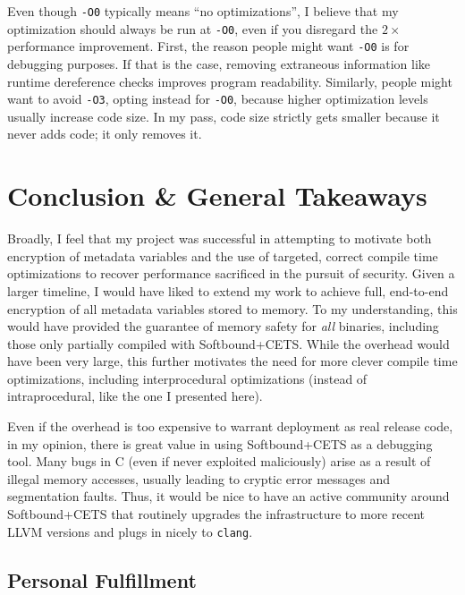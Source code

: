 \documentclass{article}
\begin{document}
                \bigbreak{}

                Even though \verb|-O0| typically means ``no optimizations'', I
                believe that my optimization should always be run at \verb|-O0|,
                even if you disregard the $2\times$ performance improvement.
                First, the reason people might want \verb|-O0| is for debugging
                purposes. If that is the case, removing extraneous information
                like runtime dereference checks improves program readability.
                Similarly, people might want to avoid \verb|-O3|, opting instead
                for \verb|-O0|, because higher optimization levels usually
                increase code size. In my pass, code size strictly gets smaller
                because it never adds code; it only removes it.
                

\section{Conclusion \& General Takeaways}

    Broadly, I feel that my project was successful in attempting to motivate
    both encryption of metadata variables and the use of targeted,
    correct compile time optimizations to recover performance sacrificed in the 
    pursuit of security. Given a larger timeline, I would have liked to extend
    my work to achieve full, end-to-end encryption of all metadata variables
    stored to memory. To my understanding, this would have provided the guarantee
    of memory safety for \textit{all} binaries, including those only partially
    compiled with Softbound+CETS. While the overhead would have been very large,
    this further motivates the need for more clever compile time optimizations, including
    interprocedural optimizations (instead of intraprocedural, like the one I
    presented here).
    
    \bigbreak{}
    Even if the overhead is too expensive to warrant deployment as real release 
    code, in my opinion, there is great value in using Softbound+CETS as a debugging tool. Many
    bugs in C (even if never exploited maliciously) arise as a result of illegal
    memory accesses, usually leading to cryptic error messages and segmentation faults. Thus, it would be nice to have an active community
    around Softbound+CETS that routinely upgrades the infrastructure to more
    recent LLVM versions and plugs in nicely to \verb|clang|.


    \subsection*{Personal Fulfillment}
\end{document}
